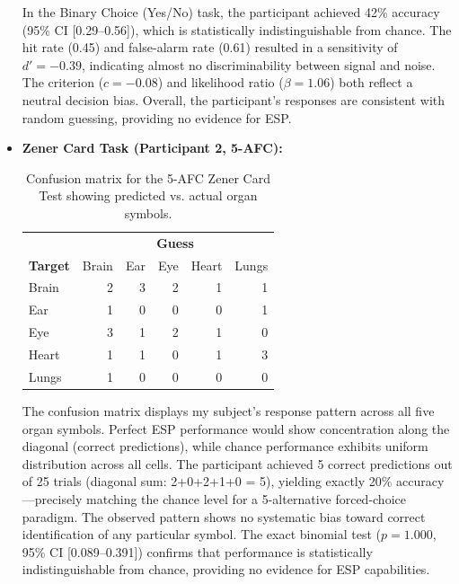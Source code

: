 \begin{itemize}
    In the Binary Choice (Yes/No) task, the participant achieved 42\% accuracy 
    (95\% CI [0.29--0.56]), which is statistically indistinguishable from chance. 
    The hit rate (0.45) and false-alarm rate (0.61) resulted in a sensitivity of 
    $d'=-0.39$, indicating almost no discriminability between signal and noise. 
    The criterion ($c=-0.08$) and likelihood ratio ($\beta=1.06$) both reflect a 
    neutral decision bias. Overall, the participant's responses are consistent with 
    random guessing, providing no evidence for ESP.

       \item \textbf{Zener Card Task (Participant 2, 5-AFC):}
    
    \begin{table}[H]
        \centering
        \caption{Confusion matrix for the 5-AFC Zener Card Test showing predicted vs. actual organ symbols.}
        \label{tab:zener_confusion}
        \begin{tabular}{lrrrrr}
        \toprule
         & \multicolumn{5}{c}{\textbf{Guess}} \\
        \cmidrule(lr){2-6}
        \textbf{Target} & Brain & Ear & Eye & Heart & Lungs \\
        \midrule
        Brain & 2 & 3 & 2 & 1 & 1 \\
        Ear & 1 & 0 & 0 & 0 & 1 \\
        Eye & 3 & 1 & 2 & 1 & 0 \\
        Heart & 1 & 1 & 0 & 1 & 3 \\
        Lungs & 1 & 0 & 0 & 0 & 0 \\
        \bottomrule
        \end{tabular}
    \end{table}
    
    The confusion matrix displays  my subject's response pattern across all five 
    organ symbols. Perfect ESP performance would show concentration along the diagonal 
    (correct predictions), while chance performance exhibits uniform distribution 
    across all cells. The participant achieved 5 correct predictions out of 25 trials 
    (diagonal sum: 2+0+2+1+0 = 5), yielding exactly 20\% accuracy---precisely matching 
    the chance level for a 5-alternative forced-choice paradigm. The observed pattern 
    shows no systematic bias toward correct identification of any particular symbol. 
    The exact binomial test ($p=1.000$, 95\% CI [0.089--0.391]) confirms that 
    performance is statistically indistinguishable from chance, providing no evidence 
     for ESP capabilities.






\end{itemize}

